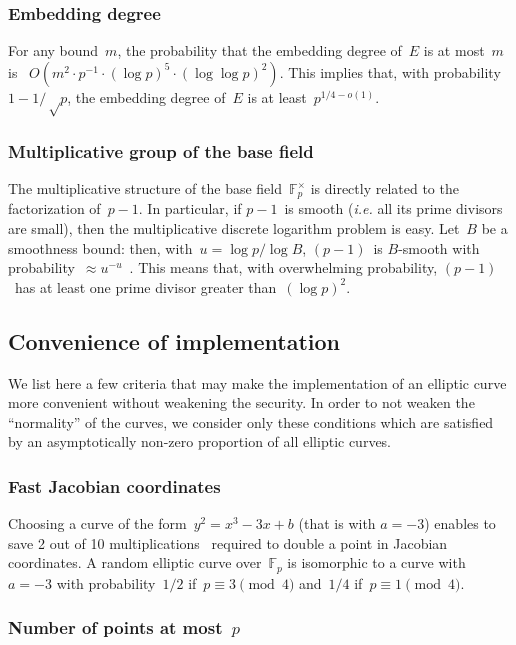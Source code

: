\documentclass[twocolumn,letterpaper]{article}
\def\F{\mathbb{F}}
\begin{document}
\subsubsection{Embedding degree}

For any bound~$m$, the probability that
the embedding degree of~$E$ is at most~$m$
is~\cite{jc1998bk} $O(m^2 · p^{-1}·(\log p)^5·(\log\log p)^2)$.
This implies that, with probability~$1 - 1/√p$,
the embedding degree of~$E$ is at least~$p^{1/4 - o(1)}$.

\subsubsection{Multiplicative group of the base field}

The multiplicative structure of the base field~$\F_p^{×}$
is directly related to the factorization of~$p-1$.
In particular, if $p-1$~is smooth
(\emph{i.e.} all its prime divisors are small),
then the multiplicative discrete logarithm problem is easy.
Let~$B$ be a smoothness bound: then, with~$u = \log p / \log B$,
$(p-1)$~is $B$-smooth with probability~$≈ u^{-u}$~\cite{jnt1983cep}.
This means that, with overwhelming probability,
$(p-1)$~has at least one prime divisor greater than~$(\log p)^2$.

\subsection{Convenience of implementation}
\label{ss:convenience}

We list here a few criteria that
may make the implementation of an elliptic curve more convenient
without weakening the security.
In order to not weaken the ``normality'' of the curves,
we consider only these conditions which are satisfied
by an asymptotically non-zero proportion of all elliptic curves.

\subsubsection{Fast Jacobian coordinates}

Choosing a curve of the form~$y^2 = x^3 - 3 x + b$ (that is with $a=-3$)
enables to save 2 out of 10 multiplications~\cite{ieeep1363}
required to double a point in Jacobian coordinates.
A random elliptic curve over~$\F_p$
is isomorphic to a curve with~$a = -3$
with probability~$1/2$ if~$p ≡ 3 \pmod{4}$ and~$1/4$ if~$p ≡ 1 \pmod{4}$.

\subsubsection{Number of points at most~$p$}
\end{document}
